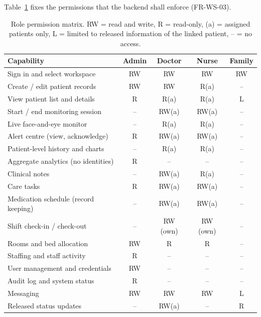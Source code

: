 \documentclass[a4paper,11pt]{scrreprt}
\begin{document}
\noindent Table~\ref{tab:perm} fixes the permissions that the backend shall enforce (FR-WS-03).

\begin{table}[h!]
\centering\small
\caption{Role permission matrix. RW = read and write, R = read-only, (a) = assigned patients only, L = limited to released information of the linked patient, -- = no access.}
\label{tab:perm}
\begin{tabular}{@{}p{6.1cm}cccc@{}}
\toprule \textbf{Capability} & \textbf{Admin} & \textbf{Doctor} & \textbf{Nurse} & \textbf{Family}\\ \midrule
Sign in and select workspace & RW & RW & RW & RW\\
Create / edit patient records & RW & RW & R(a) & --\\
View patient list and details & R & R(a) & R(a) & L\\
Start / end monitoring session & -- & RW(a) & RW(a) & --\\
Live face-and-eye monitor & -- & R(a) & R(a) & --\\
Alert centre (view, acknowledge) & R & RW(a) & RW(a) & --\\
Patient-level history and charts & -- & R(a) & R(a) & --\\
Aggregate analytics (no identities) & R & -- & -- & --\\
Clinical notes & -- & RW(a) & R(a) & --\\
Care tasks & R & RW(a) & RW(a) & --\\
Medication schedule (record keeping) & -- & RW(a) & RW(a) & --\\
Shift check-in / check-out & -- & RW (own) & RW (own) & --\\
Rooms and bed allocation & RW & R & R & --\\
Staffing and staff activity & R & -- & -- & --\\
User management and credentials & RW & -- & -- & --\\
Audit log and system status & R & -- & -- & --\\
Messaging & RW & RW & RW & L\\
Released status updates & -- & RW(a) & -- & R\\
\bottomrule
\end{tabular}
\end{table}
\end{document}
